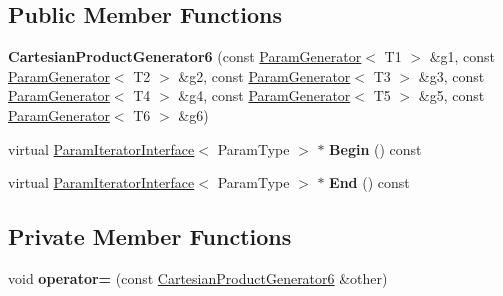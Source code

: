 \subsection*{Public Member Functions}
\begin{DoxyCompactItemize}
\item 
\mbox{\label{classtesting_1_1internal_1_1_cartesian_product_generator6_a6ff15d46e4ff7f8f24215b8244a6a094}} 
{\bfseries Cartesian\+Product\+Generator6} (const \mbox{\hyperlink{classtesting_1_1internal_1_1_param_generator}{Param\+Generator}}$<$ T1 $>$ \&g1, const \mbox{\hyperlink{classtesting_1_1internal_1_1_param_generator}{Param\+Generator}}$<$ T2 $>$ \&g2, const \mbox{\hyperlink{classtesting_1_1internal_1_1_param_generator}{Param\+Generator}}$<$ T3 $>$ \&g3, const \mbox{\hyperlink{classtesting_1_1internal_1_1_param_generator}{Param\+Generator}}$<$ T4 $>$ \&g4, const \mbox{\hyperlink{classtesting_1_1internal_1_1_param_generator}{Param\+Generator}}$<$ T5 $>$ \&g5, const \mbox{\hyperlink{classtesting_1_1internal_1_1_param_generator}{Param\+Generator}}$<$ T6 $>$ \&g6)
\item 
\mbox{\label{classtesting_1_1internal_1_1_cartesian_product_generator6_a698a1b1a1bc3d3832a292f33acd4fb8f}} 
virtual \mbox{\hyperlink{classtesting_1_1internal_1_1_param_iterator_interface}{Param\+Iterator\+Interface}}$<$ Param\+Type $>$ $\ast$ {\bfseries Begin} () const
\item 
\mbox{\label{classtesting_1_1internal_1_1_cartesian_product_generator6_a35431fe1e3b9eb35d8bfc2fcb739c4a7}} 
virtual \mbox{\hyperlink{classtesting_1_1internal_1_1_param_iterator_interface}{Param\+Iterator\+Interface}}$<$ Param\+Type $>$ $\ast$ {\bfseries End} () const
\end{DoxyCompactItemize}
\subsection*{Private Member Functions}
\begin{DoxyCompactItemize}
\item 
\mbox{\label{classtesting_1_1internal_1_1_cartesian_product_generator6_ad5effd27ca52ecac72b32cc237bb59af}} 
void {\bfseries operator=} (const \mbox{\hyperlink{classtesting_1_1internal_1_1_cartesian_product_generator6}{Cartesian\+Product\+Generator6}} \&other)
\end{DoxyCompactItemize}

